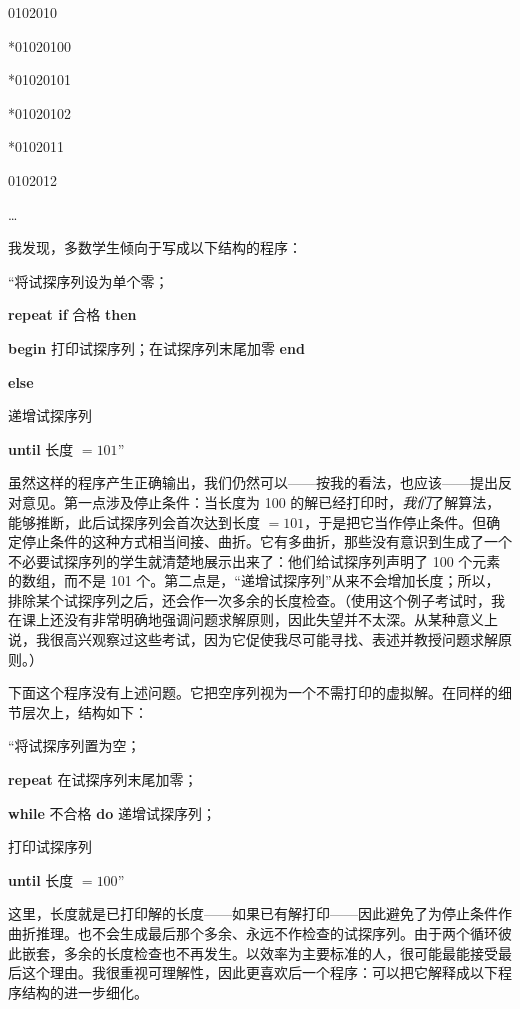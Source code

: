 \documentclass[twoside,11pt,fontset=none]{ctexbook}
\begin{document}
\noindent
\tabto{\parindent}0102010

\noindent
*\tabto{\parindent}01020100

\noindent
*\tabto{\parindent}01020101

\noindent
*\tabto{\parindent}01020102

\noindent
*\tabto{\parindent}0102011

\noindent
\tabto{\parindent}0102012

\dots

我发现，多数学生倾向于写成以下结构的程序：

\hspace{-.4em}``将试探序列设为单个零；

\textbf{repeat if} 合格 \textbf{then}

\quad \textbf{begin} 打印试探序列；在试探序列末尾加零 \textbf{end}

\quad\quad\quad \textbf{else}

\quad 递增试探序列

\textbf{until} 长度 $= 101$''

虽然这样的程序产生正确输出，我们仍然可以——按我的看法，也应该——提出反对意见。第一点涉及停止条件：当长度为 100 的解已经打印时，\textit{我们}了解算法，能够推断，此后试探序列会首次达到长度 $= 101$，于是把它当作停止条件。但确定停止条件的这种方式相当间接、曲折。它有多曲折，那些没有意识到生成了一个不必要试探序列的学生就清楚地展示出来了：他们给试探序列声明了 100 个元素的数组，而不是 101 个。第二点是，“递增试探序列”从来不会增加长度；所以，排除某个试探序列之后，还会作一次多余的长度检查。（使用这个例子考试时，我在课上还没有非常明确地强调问题求解原则，因此失望并不太深。从某种意义上说，我很高兴观察过这些考试，因为它促使我尽可能寻找、表述并教授问题求解原则。）

下面这个程序没有上述问题。它把空序列视为一个不需打印的虚拟解。在同样的细节层次上，结构如下：

\quad \hspace{-.4em}``将试探序列置为空；

\quad \textbf{repeat} 在试探序列末尾加零；

\quad \quad \textbf{while} 不合格 \textbf{do} 递增试探序列；

\quad \quad 打印试探序列

\quad \textbf{until} 长度 $= 100$''

这里，长度就是已打印解的长度——如果已有解打印——因此避免了为停止条件作曲折推理。也不会生成最后那个多余、永远不作检查的试探序列。由于两个循环彼此嵌套，多余的长度检查也不再发生。以效率为主要标准的人，很可能最能接受最后这个理由。我很重视可理解性，因此更喜欢后一个程序：可以把它解释成以下程序结构的进一步细化。
\end{document}
